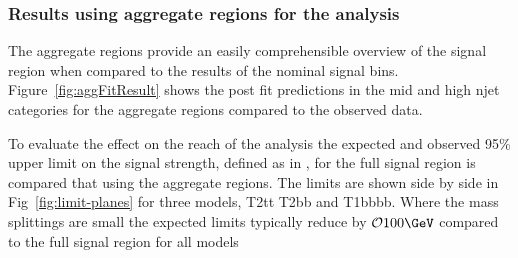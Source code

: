 \subsubsection{Results using aggregate regions for the \alphat analysis}

The aggregate regions provide an easily comprehensible
overview of the signal region when compared to the results
of the nominal signal bins. Figure~\ref{fig:aggFitResult} shows
the post fit predictions in the mid and high njet categories
for the aggregate regions compared to the observed data.

To evaluate the effect on the reach of the \alphat analysis the expected and observed 95\% upper limit
on the signal strength, defined as in \cite{limit-stuff}, for the full signal region 
is compared that using the aggregate regions. The limits are shown side by side
in Fig~\ref{fig:limit-planes} for three models, T2tt T2bb and T1bbbb. Where the mass
splittings are small the expected limits typically reduce by $\mathcal{O} 100\GeV$ 
compared to the full signal region for all models  

